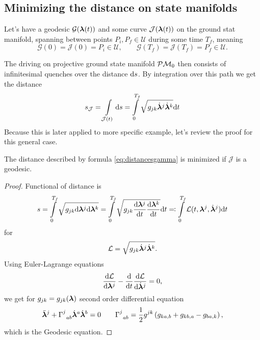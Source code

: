 \subsection{Minimizing the distance on state manifolds}
Let's have a geodesic $\mathcal G({\bm\lambda}(t))$ and some curve $\mathcal J({\bm\lambda}(t))$ on the ground stat manifold, spanning between points $P_i,P_f\in \mathcal U$ during some time $T_f$, meaning
 $$\mathcal{G}(0)=\mathcal J(0)=P_i\in\mathcal U,\qquad \mathcal{G}(T_f)=\mathcal J(T_f)=P_f\in\mathcal U.$$

The driving on projective ground state manifold $\mathcal{P}\mathcal{M}_0$ then consists of infinitesimal quenches over the distance $\mathrm{d} s$. By integration over this path we get the distance
\begin{equation}
    s_{\mathcal J}=\int\limits_{\mathcal J(t)}\mathrm{d} s=\int\limits_{0}^{T_f}\sqrt{g_{jk}\dot{{\bm\lambda}}^j\dot{{\bm\lambda}}^k}\mathrm{d} t
    \label{eq:distancesgamma}
\end{equation}
Because this is later applied to more specific example, let's review the proof for this general case.
\begin{thm}
    The distance described by formula \ref{eq:distancesgamma} is minimized if $\mathcal J$ is a geodesic.
\end{thm}

\begin{proof}
    Functional of distance is
    \begin{equation}
        s=\int\limits_0^{T_f} \sqrt{g_{jk}\mathrm{d}{\bm\lambda}^j\mathrm{d}{\bm\lambda}^k}=\int\limits_0^{T_f} \sqrt{g_{jk}\frac{\mathrm{d} {\bm\lambda}^j}{\mathrm{d} t}\frac{\mathrm{d} {\bm\lambda}^k}{\mathrm{d} t}}\mathrm{d} t \eqqcolon \int\limits_0^{T_f} \mathcal{L}(t,{\bm\lambda}^j,\dot{{\bm\lambda}}^j)\mathrm{d} t
    \end{equation}
    for 
    \begin{equation}
        \mathcal{L}=\sqrt{g_{jk}\dot{{\bm\lambda}}^j\dot{{\bm\lambda}}^k}.
    \end{equation}
    Using Euler-Lagrange equations 
    \begin{equation}
        \frac{\mathrm{d} \mathcal{L}}{\mathrm{d} {\bm\lambda}^j}-\frac{\mathrm{d} }{\mathrm{d} t}\frac{\mathrm{d} \mathcal{L}}{\mathrm{d} \dot{{\bm\lambda}}^j}=0,
    \end{equation}
    we get for $g_{jk}=g_{jk}({\bm\lambda})$ second order differential equation
    \begin{equation}
        \ddot{{\bm\lambda}}^j+\Gamma^j_{\;\;ab}\dot{{\bm\lambda}}^a\dot{{\bm\lambda}}^b=0\qquad \Gamma^j_{\;\;ab}=\frac{1}{2}g^{jk}\left(g_{ka,b}+g_{kb,a}-g_{ba,k}\right),
        \label{eq:geodesicEquaiton}
    \end{equation}
    which is the Geodesic equation.
\end{proof}




